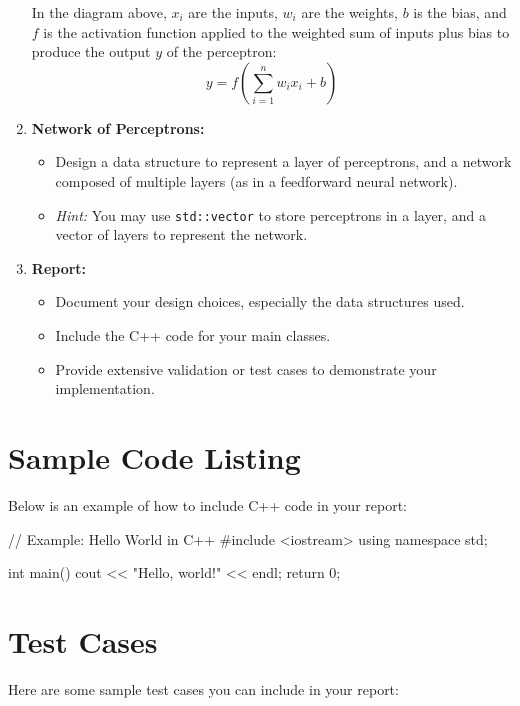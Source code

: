 \documentclass{../LatexStyle/style}
\begin{document}
\begin{instructions}
\begin{enumerate}
    In the diagram above, $x_i$ are the inputs, $w_i$ are the weights, $b$ is the bias, and $f$ is the activation function applied to the weighted sum of inputs plus bias to produce the output $y$ of the perceptron:
    \[
    y = f\left(\sum_{i=1}^{n} w_i x_i + b\right)
    \]

    \item \textbf{Network of Perceptrons:}
    \begin{itemize}
        \item Design a data structure to represent a layer of perceptrons, and a network composed of multiple layers (as in a feedforward neural network).
        \item \textit{Hint:} You may use \texttt{std::vector} to store perceptrons in a layer, and a vector of layers to represent the network.
    \end{itemize}

    \item \textbf{Report:}
    \begin{itemize}
        \item Document your design choices, especially the data structures used.
        \item Include the C++ code for your main classes.
        \item Provide extensive validation or test cases to demonstrate your implementation.
    \end{itemize}
\end{enumerate}
\end{instructions}





\section{Sample Code Listing}
Below is an example of how to include C++ code in your report:

\begin{codelisting}
// Example: Hello World in C++
#include <iostream>
using namespace std;

int main() {
    cout << "Hello, world!" << endl;
    return 0;
}
\end{codelisting}

\section{Test Cases}
Here are some sample test cases you can include in your report:
\begin{testcase}
\end{testcase}
\end{document}
